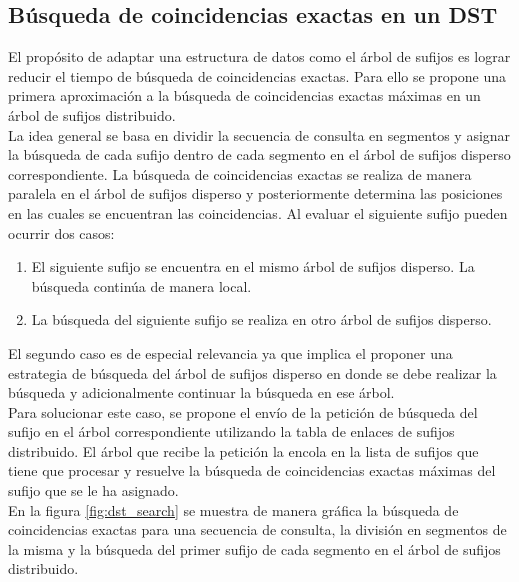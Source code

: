 \documentclass[12pt,a4paper]{article}
\begin{document}
\subsection{Búsqueda de coincidencias exactas en un DST}
El propósito de adaptar una estructura de datos como el árbol de sufijos es lograr reducir el tiempo de búsqueda de coincidencias
exactas. Para ello se propone una primera aproximación a la búsqueda de coincidencias exactas máximas en un árbol de sufijos 
distribuido.\\
La idea general se basa en dividir la secuencia de consulta en segmentos y asignar la búsqueda de cada sufijo dentro de cada
segmento en el árbol de sufijos disperso correspondiente. La búsqueda de coincidencias exactas se realiza de manera paralela en el árbol de sufijos disperso y 
posteriormente determina las posiciones en las cuales se encuentran las coincidencias. Al evaluar el siguiente sufijo pueden
ocurrir dos casos:
\begin{enumerate}
  \item El siguiente sufijo se encuentra en el mismo árbol de sufijos disperso. La búsqueda continúa de manera local.
  \item La búsqueda del siguiente sufijo se realiza en otro árbol de sufijos disperso.
\end{enumerate}
El segundo caso es de especial relevancia ya que implica el proponer una estrategia de búsqueda del árbol de sufijos disperso
en donde se debe realizar la búsqueda y adicionalmente continuar la búsqueda en ese árbol.\\
Para solucionar este caso, se propone el envío de la petición de búsqueda del sufijo en el árbol correspondiente utilizando la tabla de enlaces de sufijos distribuido. El árbol que recibe la petición la encola en la lista de sufijos que tiene que procesar y 
resuelve la búsqueda de coincidencias exactas máximas del sufijo que se le ha asignado.\\
En la figura \ref{fig:dst_search} se muestra de manera gráfica la búsqueda de coincidencias exactas para una secuencia de consulta,
la división en segmentos de la misma y la búsqueda del primer sufijo de cada segmento en el árbol de sufijos distribuido.
\end{document}
